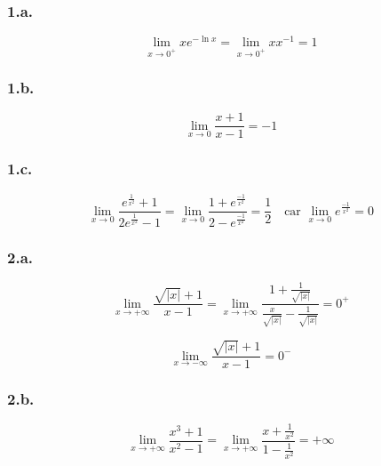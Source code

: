 \documentclass[a4paper,10pt]{report}
\begin{document}
\subsubsection*{1.a.}
\begin{displaymath}
	\lim_{x \rightarrow 0^{+}} x e^{-\ln x} = \lim_{x \rightarrow 0^{+}} x x^{-1} = 1
\end{displaymath}

\subsubsection*{1.b.}
\begin{displaymath}
	\lim_{x \rightarrow 0} \frac{x+1}{x-1} = -1
\end{displaymath}

\subsubsection*{1.c.}
\begin{displaymath}
		\lim_{x \rightarrow 0} \frac{e^{\frac{1}{x^2}}+1}{2e^{\frac{1}{x^2}}-1}
		        = \lim_{x \rightarrow 0} \frac{1 + e^{\frac{-1}{x^2}}}{2-e^{\frac{-1}{x^2}}} = \frac{1}{2}
		        \quad \text{car } \lim_{x \rightarrow 0} e^{\frac{-1}{x^2}} = 0
\end{displaymath}

\subsubsection*{2.a.}
\begin{displaymath}
	\lim_{x \rightarrow +\infty} \frac{\sqrt{|x|}+1}{x-1}
		= \lim_{x \rightarrow +\infty} \frac{1 + \frac{1}{\sqrt{|x|}}}{\frac{x}{\sqrt{|x|}}-\frac{1}{\sqrt{|x|}}}
		= 0^{+}
\end{displaymath}

\begin{displaymath}
	\lim_{x \rightarrow -\infty} \frac{\sqrt{|x|}+1}{x-1} = 0^{-}
\end{displaymath}

\subsubsection*{2.b.}
\begin{displaymath}
	\lim_{x \rightarrow +\infty} \frac{x^3+1}{x^2-1} = \lim_{x \rightarrow +\infty} \frac{ x+ \frac{1}{x^2} }{ 1- \frac{1}{x^2}} =+\infty
\end{displaymath}
\end{document}
